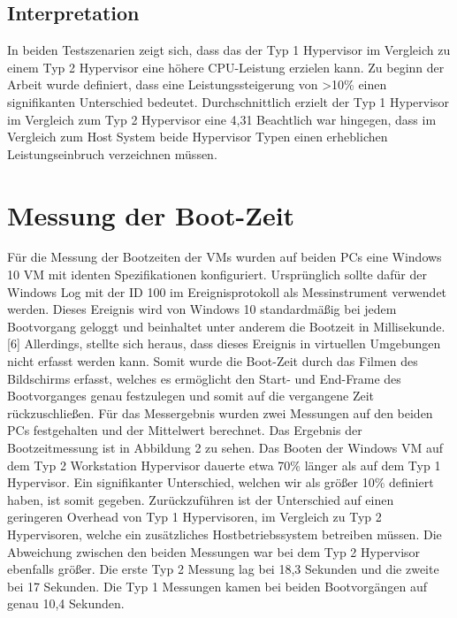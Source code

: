 \documentclass[conference]{IEEEtran}
\begin{document}
\subsection{Interpretation}
In beiden Testszenarien zeigt sich, dass das der Typ 1 Hypervisor im Vergleich zu einem Typ 2 Hypervisor eine höhere CPU-Leistung erzielen kann. Zu beginn der Arbeit wurde definiert, dass eine Leistungssteigerung von >10\% einen signifikanten Unterschied bedeutet. Durchschnittlich erzielt der Typ 1 Hypervisor im Vergleich zum Typ 2 Hypervisor eine 4,31%
Beachtlich war hingegen, dass im Vergleich zum Host System beide Hypervisor Typen einen erheblichen Leistungseinbruch verzeichnen müssen.

\section{Messung der Boot-Zeit}
\label{Messung der CPU Performance}
Für die Messung der Bootzeiten der VMs wurden auf beiden PCs eine Windows 10 VM mit identen Spezifikationen konfiguriert. Ursprünglich sollte dafür der Windows Log mit der ID 100 im Ereignisprotokoll als Messinstrument verwendet werden. Dieses Ereignis wird von Windows 10 standardmäßig bei jedem Bootvorgang geloggt und beinhaltet unter anderem die Bootzeit in Millisekunde. [6] Allerdings, stellte sich heraus, dass dieses Ereignis in virtuellen Umgebungen nicht erfasst werden kann. Somit wurde die Boot-Zeit durch das Filmen des Bildschirms erfasst, welches es ermöglicht den Start- und End-Frame des Bootvorganges genau festzulegen und somit auf die vergangene Zeit rückzuschließen. Für das Messergebnis wurden zwei Messungen auf den beiden PCs festgehalten und der Mittelwert berechnet.
Das Ergebnis der Bootzeitmessung ist in Abbildung 2 zu sehen. Das Booten der Windows VM auf dem Typ 2 Workstation Hypervisor dauerte etwa 70\% länger als auf dem Typ 1 Hypervisor. Ein signifikanter Unterschied, welchen wir als größer 10\% definiert haben, ist somit gegeben. Zurückzuführen ist der Unterschied auf einen geringeren Overhead von Typ 1 Hypervisoren, im Vergleich zu Typ 2 Hypervisoren, welche ein zusätzliches Hostbetriebssystem betreiben müssen. Die Abweichung zwischen den beiden Messungen war bei dem Typ 2 Hypervisor ebenfalls größer. Die erste Typ 2 Messung lag bei 18,3 Sekunden und die zweite bei 17 Sekunden. Die Typ 1 Messungen kamen bei beiden Bootvorgängen auf genau 10,4 Sekunden.
\end{document}
